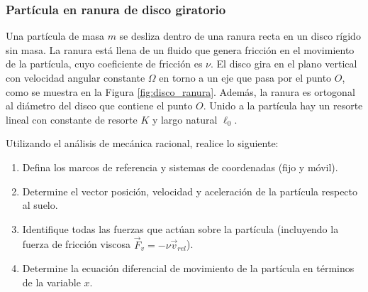 \subsubsection{Partícula en ranura de disco giratorio}

Una partícula de masa $m$ se desliza dentro de una ranura recta en un disco rígido sin masa. La ranura está llena de un fluido que genera fricción en el movimiento de la partícula, cuyo coeficiente de fricción es $\nu$. El disco gira en el plano vertical con velocidad angular constante $\Omega$ en torno a un eje que pasa por el punto $O$, como se muestra en la Figura \ref{fig:disco_ranura}. Además, la ranura es ortogonal al diámetro del disco que contiene el punto $O$. Unido a la partícula hay un resorte lineal con constante de resorte $K$ y largo natural $\ell_0$. 

Utilizando el análisis de mecánica racional, realice lo siguiente:

\begin{enumerate}
    \item Defina los marcos de referencia y sistemas de coordenadas (fijo y móvil).
    \item Determine el vector posición, velocidad y aceleración de la partícula respecto al suelo.
    \item Identifique todas las fuerzas que actúan sobre la partícula (incluyendo la fuerza de fricción viscosa $\vec{F}_v = -\nu \vec{v}_{rel}$).
    \item Determine la ecuación diferencial de movimiento de la partícula en términos de la variable $x$.
\end{enumerate}

